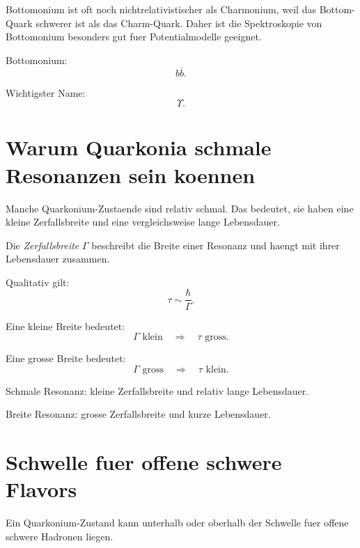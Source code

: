 \begin{notebox}
Bottomonium ist oft noch nichtrelativistischer als Charmonium, weil das Bottom-Quark
schwerer ist als das Charm-Quark.
Daher ist die Spektroskopie von Bottomonium besonders gut fuer Potentialmodelle
geeignet.
\end{notebox}

\begin{examtipbox}
Bottomonium:
\[
    b\overline{b}.
\]

Wichtigster Name:
\[
    \Upsilon.
\]
\end{examtipbox}

\section{Warum Quarkonia schmale Resonanzen sein koennen}

Manche Quarkonium-Zustaende sind relativ schmal.
Das bedeutet, sie haben eine kleine Zerfallsbreite und eine vergleichsweise lange
Lebensdauer.

\begin{definitionbox}
Die \emph{Zerfallsbreite} $\Gamma$ beschreibt die Breite einer Resonanz und haengt
mit ihrer Lebensdauer zusammen.
\end{definitionbox}

\begin{formulabox}
Qualitativ gilt:
\[
    \tau \sim \frac{\hbar}{\Gamma}.
\]
\end{formulabox}

\begin{conceptbox}
Eine kleine Breite bedeutet:
\[
    \Gamma \text{ klein}
    \quad\Rightarrow\quad
    \tau \text{ gross}.
\]

Eine grosse Breite bedeutet:
\[
    \Gamma \text{ gross}
    \quad\Rightarrow\quad
    \tau \text{ klein}.
\]
\end{conceptbox}

\begin{examtipbox}
Schmale Resonanz:
kleine Zerfallsbreite und relativ lange Lebensdauer.

Breite Resonanz:
grosse Zerfallsbreite und kurze Lebensdauer.
\end{examtipbox}

\section{Schwelle fuer offene schwere Flavors}

Ein Quarkonium-Zustand kann unterhalb oder oberhalb der Schwelle fuer offene schwere
Hadronen liegen.

